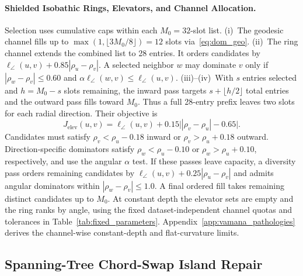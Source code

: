 \paragraph{Shielded Isobathic Rings, Elevators, and Channel Allocation.}
Selection uses cumulative caps within each $M_0=32$-slot list.
(i)~The geodesic channel fills up to $\max(1,\lfloor3M_0/8\rfloor)=12$ slots via~\eqref{eq:dom_geo}.
(ii)~The ring channel extends the combined list to 28 entries. It orders candidates by $\ell_\angle(u,v)+0.85|\rho_u-\rho_v|$. A selected neighbor $w$ may dominate $v$ only if $|\rho_w-\rho_v|\le0.60$ and $\alpha\ell_\angle(w,v)\le\ell_\angle(u,v)$.
(iii)--(iv)~With $s$ entries selected and $h=M_0-s$ slots remaining, the inward pass targets $s+\lfloor h/2\rfloor$ total entries and the outward pass fills toward $M_0$. Thus a full 28-entry prefix leaves two slots for each radial direction. Their objective is
\begin{equation}
 J_{\mathrm{elev}}(u,v)=\ell_\angle(u,v)
 +0.15\bigl||\rho_v-\rho_u|-0.65\bigr|.
 \label{eq:elevator_obj}
\end{equation}
Candidates must satisfy $\rho_v<\rho_u-0.18$ inward or $\rho_v>\rho_u+0.18$ outward. Direction-specific dominators satisfy $\rho_w<\rho_u-0.10$ or $\rho_w>\rho_u+0.10$, respectively, and use the angular $\alpha$ test.
If these passes leave capacity, a diversity pass orders remaining candidates by $\ell_\angle(u,v)+0.25|\rho_u-\rho_v|$ and admits angular dominators within $|\rho_w-\rho_v|\le1.0$. A final ordered fill takes remaining distinct candidates up to $M_0$.
At constant depth the elevator sets are empty and the ring ranks by angle, using the fixed dataset-independent channel quotas and tolerances in Table~\ref{tab:fixed_parameters}. Appendix~\ref{app:vamana_pathologies} derives the channel-wise constant-depth and flat-curvature limits.

\subsection{Spanning-Tree Chord-Swap Island Repair}
\label{subsec:repair}

